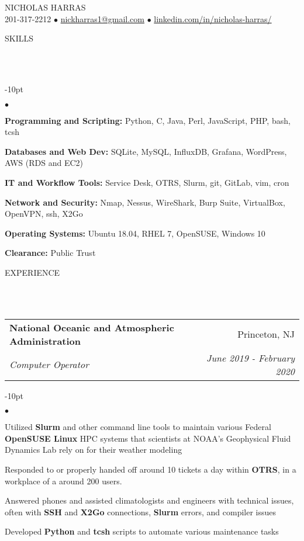 \documentclass[12pt]{article}
\makeatletter
\newcommand{\mailto}[1]{
	\href{mailto:#1}{#1}
}
\newcommand{\contact}[2]{
	\vspace*{-8pt}
	\begin{center}
		{#1}\\ %
		#2
	\end{center}
	\vspace*{-12pt}
}
\newcommand{\header}[1]{
	\vspace*{12pt} %
	{\hspace*{-14pt}\vspace*{6pt} #1}
	\vspace*{-6pt} 
	\lineunder
}
\newcommand{\lineunder}{
	\vspace*{-8pt} \\ 
	\hspace*{-18pt} 
	\hrulefill \\
}
\newcommand{\subheading}[4]{
 	\vspace{5pt}
    	\begin{tabular*}{1.01\textwidth}
    		{l@{\extracolsep{\fill}}r}
      		\hspace{-16pt}\textbf{#1} & #2 \\
      		\hspace{-16pt}\textit{\small#3} & \textit{\small #4} \\
    	\end{tabular*}
    \vspace{-4pt}
}
\newenvironment{achievements}{
\begin{adjustwidth}{-10pt}{}
  \begin{list}{$\bullet$}{
  	\topsep 0pt \itemsep -4pt}}
  	{\vspace*{2pt}\end{list}
\end{adjustwidth}
}
\makeatother
\begin{document}
\small
\smallskip
\vspace*{-40pt}

\contact{\huge{N}\LARGE{ICHOLAS} \huge{H}\LARGE{ARRAS}}{201-317-2212 $\bullet$ \mailto{nickharras1@gmail.com} $\bullet$ \href{https://www.github.com/harras}{linkedin.com/in/nicholas-harras/}}

\vspace{-8pt}
\header{SKILLS}
	\begin{achievements}
		\item{\bf Programming and Scripting:} Python, C, Java, Perl, JavaScript, PHP, bash, tcsh
		\item{\bf Databases and Web Dev:} SQLite, MySQL, InfluxDB, Grafana, WordPress, AWS (RDS and EC2)
		\item{\bf IT and Workflow Tools:} Service Desk, OTRS, Slurm, git, GitLab, vim, cron 
		\item{\bf Network and Security:} Nmap, Nessus, WireShark, Burp Suite, VirtualBox, OpenVPN, ssh, X2Go
		\item{\bf Operating Systems:} Ubuntu 18.04, RHEL 7, OpenSUSE, Windows 10
		\item{\bf Clearance:} Public Trust
	\end{achievements}

\vspace{-8pt}
\header{EXPERIENCE}

\subheading
	{National Oceanic and Atmospheric Administration}{Princeton, NJ}
	{Computer Operator}{June 2019 - February 2020}
	\begin{achievements}
		\item Utilized \textbf{Slurm} and other command line tools to maintain various Federal \textbf{OpenSUSE Linux} HPC systems that scientists at NOAA's Geophysical Fluid Dynamics Lab rely on for their weather modeling
		\item Responded to or properly handed off around 10 tickets a day within \textbf{OTRS}, in a workplace of a around 200 users.	
		\item Answered phones and assisted climatologists and engineers with technical issues, often with \textbf{SSH} and \textbf{X2Go} connections, \textbf{Slurm} errors, and compiler issues
		\item Developed \textbf{Python} and \textbf{tcsh} scripts to automate various maintenance tasks
		
		
	\end{achievements}
	
\end{document}

